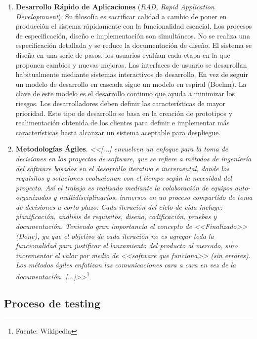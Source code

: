 \begin{enumerate}
\item \textbf{Desarrollo Rápido de Aplicaciones} (\emph{RAD, Rapid Application Developmnent}). Su filosofía es sacrificar calidad a cambio de poner en producción el sistema rápidamente con la funcionalidad esencial. Los procesos de especificación, diseño e implementación son simultáneos. No se realiza una especificación detallada y se reduce la documentación de diseño. El sistema se diseña en una serie de pasos, los usuarios evalúan cada etapa en la que proponen cambios y nuevas mejoras. Las interfaces de usuario se desarrollan habitualmente mediante sistemas interactivos de desarrollo. En vez de seguir un modelo de desarrollo en cascada sigue un modelo en espiral (Boehm). La clave de este modelo es el desarrollo continuo que ayuda a minimizar los riesgos. Los desarrolladores deben definir las características de mayor prioridad. Este tipo de desarrollo se basa en la creación de prototipos y realimentación obtenida de los clientes para definir e implementar más características hasta alcanzar un sistema aceptable para despliegue.

\item \textbf{Metodologías Ágiles}. \emph{<<[...] envuelven un enfoque para la toma de decisiones en los proyectos de software, que se refiere a métodos de ingeniería del software basados en el desarrollo iterativo e incremental, donde los requisitos y soluciones evolucionan con el tiempo según la necesidad del proyecto. Así el trabajo es realizado mediante la colaboración de equipos auto-organizados y multidisciplinarios, inmersos en un proceso compartido de toma de decisiones a corto plazo. Cada iteración del ciclo de vida incluye:  planificación, análisis de requisitos, diseño, codificación, pruebas y  documentación. Teniendo gran importancia el concepto de <<Finalizado>> (Done), ya que el objetivo de cada iteración no es agregar toda la funcionalidad para justificar el lanzamiento del producto al mercado, sino incrementar el valor por medio de <<software que funciona>> (sin errores). Los métodos ágiles enfatizan las comunicaciones cara a cara en vez de la documentación. [...]>>}\footnote{Fuente: Wikipedia}
\end{enumerate}




\subsection{Proceso de testing}

